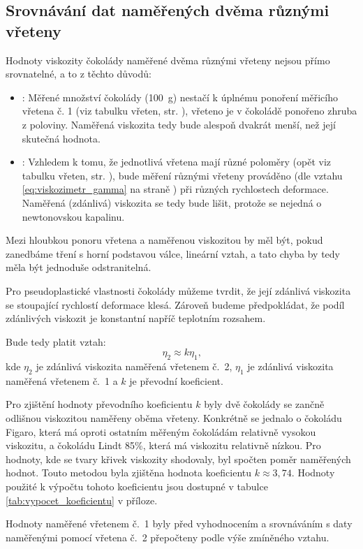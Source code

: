 \documentclass[12pt]{article}
\begin{document}
\subsection{Srovnávání dat naměřených dvěma různými vřeteny}
Hodnoty viskozity čokolády naměřené dvěma různými vřeteny nejsou přímo srovnatelné, a to z těchto důvodů:
\begin{itemize}[noitemsep, topsep = 0pt]
    \item \underline{}: Měřené množství čokolády (\SI{100}{\gram}) nestačí k úplnému ponoření měřicího vřetena č. 1 (viz tabulku vřeten, str. \pageref{tab:vretena}), vřeteno je v čokoládě ponořeno zhruba z poloviny. Naměřená viskozita tedy bude alespoň dvakrát menší, než její skutečná hodnota. 
    \item \underline{}: Vzhledem k tomu, že jednotlivá vřetena mají různé poloměry (opět viz tabulku vřeten, str. \pageref{tab:vretena}), bude měření různými vřeteny prováděno (dle vztahu \ref{eq:viskozimetr_gamma} na straně \pageref{eq:viskozimetr_gamma}) při různých rychlostech deformace. Naměřená (zdánlivá) viskozita se tedy bude lišit, protože se nejedná o newtonovskou kapalinu.
\end{itemize}
Mezi hloubkou ponoru vřetena a naměřenou viskozitou by měl být, pokud zanedbáme tření s horní podstavou válce, lineární vztah, a tato chyba by tedy měla být jednoduše odstranitelná.
\par\noindent
Pro pseudoplastické vlastnosti čokolády můžeme tvrdit, že její zdánlivá viskozita se stoupající rychlostí deformace klesá. Zároveň budeme předpokládat, že podíl zdánlivých viskozit je konstantní napříč teplotním rozsahem.
\par\noindent
Bude tedy platit vztah:
\begin{equation}
    \eta_2 \approx k\eta_1\text{,}
    \label{eq:prepocet}
\end{equation}
kde $\eta_2$ je zdánlivá viskozita naměřená vřetenem č.~2, $\eta_1$ je zdánlivá viskozita naměřená vřetenem č.~1 a $k$ je převodní koeficient.
\par\noindent
Pro zjištění hodnoty převodního koeficientu $k$ byly dvě čokolády se zančně odlišnou viskozitou naměřeny oběma vřeteny. Konkrétně se jednalo o čokoládu Figaro, která má oproti ostatním měřeným čokoládám relativně vysokou viskozitu, a čokoládu Lindt 85\%, která má viskozitu relativně nízkou. Pro hodnoty, kde se tvary křivek viskozity shodovaly, byl spočten poměr naměřených hodnot. Touto metodou byla zjištěna hodnota koeficientu $k\approx 3,74$. Hodnoty použité k výpočtu tohoto koeficientu jsou dostupné v tabulce \ref{tab:vypocet_koeficientu} v příloze.
\par\noindent
Hodnoty naměřené vřetenem č.~1 byly před vyhodnocením a srovnáváním s daty naměřenými pomocí vřetena č.~2 přepočteny podle výše zmíněného vztahu.
\end{document}
